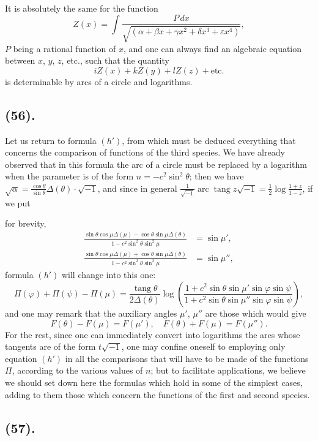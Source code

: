 \documentclass{article}
\begin{document}
It is absolutely the same for the function
\[ Z(x)=\int\frac{P\,dx}{\sqrt{(\alpha+\beta x+\gamma x^{2}+\delta x^{3}+\varepsilon x^{4})}}, \]
$P$ being a rational function of $x$, and one can always find an algebraic equation between $x$, $y$, $z$, etc., such that the quantity
\[ iZ(x)+kZ(y)+lZ(z)+\text{etc.} \]
is determinable by arcs of a circle and logarithms.

\subsection*{(56).}

Let us return to formula $(h')$, from which must be deduced everything that concerns the comparison of functions of the third species. We have already observed that in this formula the arc of a circle must be replaced by a logarithm when the parameter is of the form $n=-c^{2}\sin^{2}\theta$; then we have $\sqrt{\alpha}=\frac{\cos\theta}{\sin\theta}\Delta(\theta)\cdot\sqrt{-1}$, and since in general $\frac{1}{\sqrt{-1}}\operatorname{arc}\operatorname{tang}z\sqrt{-1}=\frac{1}{2}\log\frac{1+z}{1-z}$, if we put

for brevity,
\[ \begin{aligned} \frac{\sin\theta\cos\mu\Delta(\mu)-\cos\theta\sin\mu\Delta(\theta)}{1-c^{2}\sin^{2}\theta\sin^{2}\mu}&=\sin\mu',\\ \frac{\sin\theta\cos\mu\Delta(\mu)+\cos\theta\sin\mu\Delta(\theta)}{1-c^{2}\sin^{2}\theta\sin^{2}\mu}&=\sin\mu'', \end{aligned} \]
formula $(h')$ will change into this one:
\[ \Pi(\varphi)+\Pi(\psi)-\Pi(\mu)=\frac{\operatorname{tang}\theta}{2\Delta(\theta)}\log\left(\frac{1+c^{2}\sin\theta\sin\mu'\sin\varphi\sin\psi}{1+c^{2}\sin\theta\sin\mu''\sin\varphi\sin\psi}\right), \]
and one may remark that the auxiliary angles $\mu'$, $\mu''$ are those which would give
\[ F(\theta)-F(\mu)=F(\mu'),\quad F(\theta)+F(\mu)=F(\mu''). \]
For the rest, since one can immediately convert into logarithms the arcs whose tangents are of the form $t\sqrt{-1}$, one may confine oneself to employing only equation $(h')$ in all the comparisons that will have to be made of the functions $\Pi$, according to the various values of $n$; but to facilitate applications, we believe we should set down here the formulas which hold in some of the simplest cases, adding to them those which concern the functions of the first and second species.

\subsection*{(57).}
\end{document}
